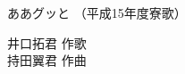 \documentclass[10pt,b5j]{tarticle} %
\begin{document}
\begin{minipage}[c]{0.7\hsize} %
    \begin{center}
        {\LARGE
            ああグッと %
        }
        {\small 
            （平成15年度寮歌） %
        }
    \end{center}
\end{minipage}
\begin{minipage}[c]{0.3\hsize} %
    \begin{flushright} %
        井口拓君 作歌\\持田翼君 作曲 %
    \end{flushright}
\end{minipage}
\end{document}
